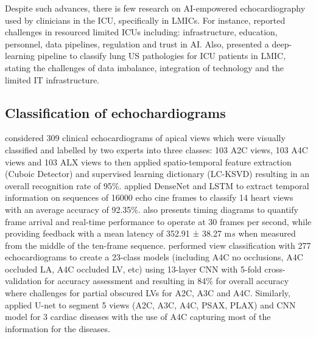 \documentclass[mlabstract,twocolumn]{jmlr}
\begin{document}
Despite such advances, there is few research on AI-empowered echocardiography used by clinicians in the ICU, specifically in LMICs.
For instance, \cite{2021-huyNhat-vanHao-in-FAIR-MICCAI} reported challenges in resourced limited ICUs including: infrastructure, education, personnel, data pipelines, regulation and trust in AI.
Also, \cite{2021-kerdegari-Applied-Sciences-MDPI, 2021-kerdegari-ISBI-IEEE, 2021-huyNhat-kerdegari-in-FAIR-MICCAI} presented a deep-learning pipeline to classify lung US pathologies for ICU patients in LMIC, stating the challenges of data imbalance, integration of technology and the limited IT infrastructure.

\subsection{Classification of echochardiograms} \label{subsec:Nets_echochardiograms}
\citet{khamis2017} considered 309 clinical echocardiograms of apical views which were visually classified and labelled by two experts into three classes: 103 A2C views, 103 A4C views and 103 ALX views to then applied spatio-temporal feature extraction (Cuboic Detector) and supervised learning dictionary (LC-KSVD) resulting in an overall recognition rate of 95\%.
\citet{woudenberg2018} applied DenseNet and LSTM to extract temporal information on sequences of 16000 echo cine frames to classify 14 heart views with an average accuracy of 92.35\%.
\citet{woudenberg2018} also presents timing diagrams to quantify frame arrival and real-time performance to operate at 30 frames per second, while providing feedback with a mean latency of 352.91 ± 38.27 m$s$ when measured from the middle of the ten-frame sequence.
\citet{zhang2018} performed view classification with 277 echocardiograms to create a 23-class models (including A4C no occlusions, A4C occluded LA, A4C occluded LV, etc) using 13-layer CNN with 5-fold cross-validation for accuracy assessment and resulting in 84\% for overall accuracy where challenges for partial obscured LVs for A2C, A3C and A4C.
Similarly, \citet{zhang2018} applied U-net to segment 5 views (A2C, A3C, A4C, PSAX, PLAX) and CNN model for 3 cardiac diseases with the use of A4C capturing most of the information for the diseases.
\end{document}
